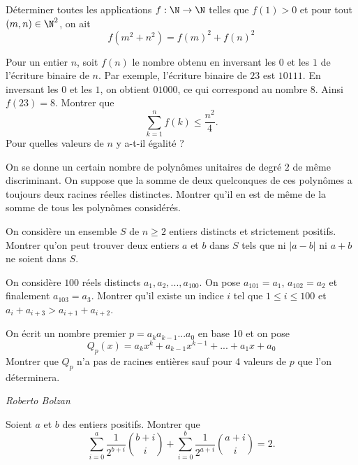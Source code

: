 \begin{exo}{}
Déterminer toutes les applications $f : \N \rightarrow \N$ telles que $f(1)>0$ et pour tout $(m,n) \in \N^{2}$, on ait
\[f(m^2+n^2) = f(m)^2+f(n)^2\]
\end{exo}

\begin{exo}{}
Pour un entier $n$, soit $f(n)$ le nombre obtenu en inversant les $0$ et les $1$ de l'écriture binaire de $n$. Par exemple, l'écriture binaire de $23$ est $10111$. En inversant les $0$ et les $1$, on obtient $01000$, ce qui correspond au nombre $8$. Ainsi $f(23)=8$. Montrer que
\[\sum_{k=1}^n f(k) \leq \frac{n^2}{4}.\]
Pour quelles valeurs de $n$ y a-t-il égalité ?
\end{exo}


\begin{exo}{}
On se donne un certain nombre de polynômes unitaires de degré $2$ de même discriminant. On suppose que la somme de deux quelconques de ces polynômes a toujours deux racines réelles distinctes. Montrer qu'il en est de même de la somme de tous les polynômes considérés.
\end{exo}


\begin{exo}{}
On considère un ensemble $S$ de $n\ge 2$ entiers distincts et strictement positifs. Montrer qu'on peut trouver deux entiers $a$ et $b$ dans $S$ tels que ni $|a-b|$ ni $a+b$ ne soient dans $S$.
 \end{exo}

\begin{exo}{}
On considère $100$ réels distincts $a_1,a_2,...,a_{100}$. On pose $a_{101}=a_1$, $a_{102}=a_2$ et finalement $a_{103}=a_3$. Montrer qu'il existe un indice $i$ tel que $1\le i \le 100$ et $a_{i}+a_{i+3}>a_{i+1}+a_{i+2}$.
\end{exo}
\begin{exo}{}
On écrit un nombre premier $p=a_ka_{k-1}...a_0$ en base 10 et on pose
\[Q_p(x)=a_kx^k+a_{k-1}x^{k-1}+...+a_1x+a_0\]
Montrer que $Q_p$ n'a pas de racines entières sauf pour 4 valeurs de $p$ que l'on déterminera.

\medskip
\textit{Roberto Bolzan}
\end{exo}

%
\begin{exo}{}
Soient $a$ et $b$ des entiers positifs. Montrer que
$$\displaystyle \sum_{i=0}^{a} \frac{1}{2^{b+i}} \binom{b+i}{i} + \displaystyle\sum_{i=0}^{b} \frac{1}{2^{a+i}} \binom{a+i}{i} = 2.$$
\end{exo}


